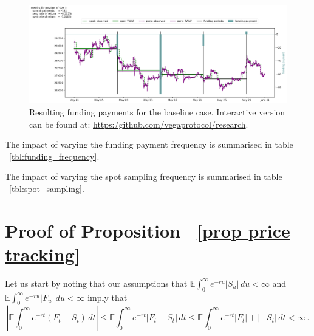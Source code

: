 \documentclass[10pt]{article}
\begin{document}
\begin{figure}[h]
    \centering
    \includegraphics[width=\textwidth]{./plots/7d-payment-frequency_8h-spot-sampling-300s_perp-sampling.png}
    \caption{Resulting funding payments for the baseline case. Interactive version can be found at: \href{https:/github.com/vegaprotocol/research}{https:/github.com/vegaprotocol/research}.}
    \label{fig:resulting_funding_periods}
\end{figure}

The impact of varying the funding payment frequency is summarised in table ~\ref{tbl:funding_frequency}.



The impact of varying the spot sampling frequency is summarised in table ~\ref{tbl:spot_sampling}.



\appendix
\section{Proof of Proposition ~\ref{prop price tracking}}
Let us start by noting that our assumptions that $\mathbb E\int_0^\infty e^{-ru} |S_u|\,du < \infty$ and $\mathbb E\int_0^\infty e^{-ru} |F_u|\,du < \infty$ imply that 
\[
\left|\mathbb E \int_0^\infty e^{-rt}(F_t-S_t)\,dt\right| \leq \mathbb E \int_0^\infty e^{-rt}\left|F_t-S_t\right|\,dt \leq \mathbb E \int_0^\infty e^{-rt}|F_t|+|-S_t|\,dt < \infty\,.
\]
\end{document}
